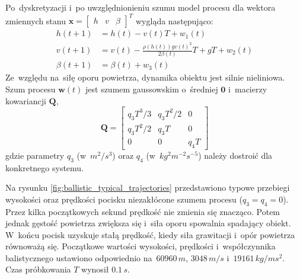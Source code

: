 Po~dyskretyzacji i~po uwzględnionieniu szumu model procesu dla wektora zmiennych stanu $\boldsymbol{x}=\begin{bmatrix}
h & v & \beta
\end{bmatrix}^T$ wygląda następująco:
\begin{align}\label{eq:missile_tracking_discretized_model}
	h(t+1) &= h(t) - v(t)T + w_1(t) \nonumber \\
	v(t+1) &= v(t)-\frac{\rho(h(t))gv(t)^2}{2\beta(t)}T + gT + w_2(t) \nonumber \\
	\beta(t+1) &= \beta(t) + w_3(t)
\end{align}
Ze~względu na~siłę oporu powietrza, dynamika obiektu jest silnie nieliniowa. Szum procesu $\boldsymbol{w}(t)$ jest szumem gaussowskim o~średniej $\boldsymbol{0}$ i~macierzy kowariancji $\boldsymbol{Q}$,
\begin{equation}
\boldsymbol{Q} = 
	\begin{bmatrix}
	q_3T^3/3 & q_3T^2/2 & 0 \\
	q_3T^2/2 & q_3T & 0 \\
	0 & 0 & q_4T
	\end{bmatrix}
\end{equation}
gdzie parametry $q_3$ (w~$m^2/s^3$) oraz $q_4$ (w~$kg^2m^{-2}s^{-5}$) należy dostroić dla konkretnego systemu. \par
Na rysunku \ref{fig:ballistic_typical_trajectories} przedstawiono typowe przebiegi wysokości oraz prędkości pocisku niezakłócone szumem procesu ($q_3=q_4=0$). Przez kilka początkowych sekund prędkość nie zmienia się znacząco. Potem jednak gęstość powietrza zwiększa się i~siła oporu spowalnia spadający obiekt. W~końcu pocisk uzyskuje stałą prędkość, kiedy siła grawitacji i~opór powietrza równoważą się. Początkowe wartości wysokości, prędkości i~współczynnika balistycznego ustawiono odpowiednio na~$60960\,m$, $3048\,m/s$ i~$19161\,kg/ms^2$. Czas próbkowania $T$ wynosił $0.1\,s$.\par
